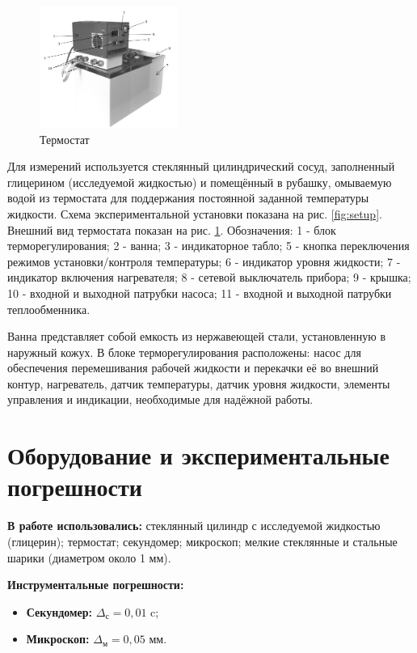 \documentclass[a4paper,12pt]{article} %
\begin{document}
\begin{figure}
    \centering
    \includegraphics[width = 0.4\textwidth]{photo.PNG}
    \caption{Термостат}
    \label{fig:photo}
\end{figure}

Для измерений используется стеклянный цилиндрический сосуд, заполненный глицерином (исследуемой жидкостью) и помещённый в рубашку, омываемую водой из термостата для поддержания постоянной заданной температуры жидкости. Схема экспериментальной установки показана на рис. \ref{fig:setup}. Внешний вид термостата показан на рис. \ref{fig:photo}. Обозначения: 1 - блок терморегулирования; 2 - ванна; 3 - индикаторное табло; 5 - кнопка переключения режимов установки/контроля температуры; 6 - индикатор уровня жидкости; 7 - индикатор включения нагревателя; 8 - сетевой выключатель прибора; 9 - крышка; 10 - входной и выходной патрубки насоса; 11 - входной и выходной патрубки теплообменника. 

Ванна представляет собой емкость из нержавеющей стали, установленную в наружный кожух. В блоке терморегулирования расположены: насос для обеспечения перемешивания рабочей жидкости и перекачки её во внешний контур, нагреватель, датчик температуры, датчик уровня жидкости, элементы управления и индикации, необходимые для надёжной работы.

\section{Оборудование и экспериментальные погрешности}

\textbf{В работе использовались:} стеклянный цилиндр с исследуемой жидкостью (глицерин); термостат; секундомер; микроскоп; мелкие стеклянные и стальные шарики (диаметром около 1 мм).

\textbf{Инструментальные погрешности:}

\begin{itemize}
    \item \textbf{Секундомер:} $\Delta_\text{с} = 0,01 $ c;
    \item \textbf{Микроскоп:} $\Delta_\text{м} = 0,05 $ мм.
\end{itemize}
\end{document}

